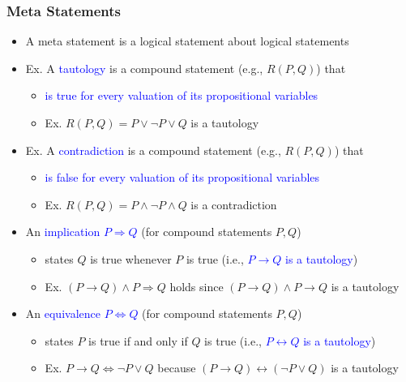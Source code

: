 \documentclass[10pt,english]{beamer}
\begin{document}
\begin{frame} \frametitle{Meta Statements}
  

\begin{itemize}
\setlength\itemsep{2mm}
\item<1-> A meta statement is a logical statement about logical statements


\item<2-> Ex. A \textcolor{blue}{tautology} is a compound statement (e.g., $R(P,Q)$) that \vspace{1mm}
\begin{itemize}
 \setlength\itemsep{1.5mm}
 \item \textcolor{blue}{is true for every valuation of its propositional variables}
 \item Ex. $R(P,Q) = P \vee \neg P \vee Q$ is a tautology
\end{itemize}

\vspace{1mm}

\item<2-> Ex. A \textcolor{blue}{contradiction} is a compound statement (e.g., $R(P,Q)$) that \vspace{1mm}
\begin{itemize}
  \setlength\itemsep{1.5mm}
 \item  \textcolor{blue}{is false for every valuation of its propositional variables}
 \item Ex. $R(P,Q) = P \wedge \neg P \wedge Q$ is a contradiction
\end{itemize}

\vspace{1mm}

\item<3-> An \textcolor{blue}{implication $P \Rightarrow Q$} (for compound statements $P,Q$) \vspace{1mm}
\begin{itemize}
  \setlength\itemsep{1.5mm}
 \item states $Q$ is true whenever $P$ is true (i.e., \textcolor{blue}{$P \rightarrow Q$ is a tautology})
 \item Ex. $(P \rightarrow Q) \wedge P \Rightarrow Q$ holds since $(P \rightarrow Q) \wedge P \rightarrow Q$ is a tautology
\end{itemize}

\item<4-> An \textcolor{blue}{equivalence $P \Leftrightarrow Q$} (for compound statements $P,Q$) \vspace{1mm}
\begin{itemize}
  \setlength\itemsep{1.5mm}
 \item states $P$ is true if and only if $Q$ is true (i.e., \textcolor{blue}{$P \leftrightarrow Q$ is a tautology})
 \item Ex. $P \rightarrow Q \Leftrightarrow \neg P \vee Q$ because $(P \rightarrow Q) \leftrightarrow (\neg P \vee Q)$ is a tautology
\end{itemize}

\end{itemize}


\end{frame}
\end{document}
